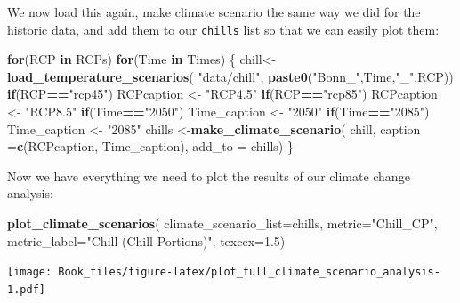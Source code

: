 \documentclass[
]{book}
\newenvironment{Shaded}{\begin{snugshade}}{\end{snugshade}}
\newcommand{\ControlFlowTok}[1]{\textcolor[rgb]{0.13,0.29,0.53}{\textbf{#1}}}
\newcommand{\DataTypeTok}[1]{\textcolor[rgb]{0.13,0.29,0.53}{#1}}
\newcommand{\FloatTok}[1]{\textcolor[rgb]{0.00,0.00,0.81}{#1}}
\newcommand{\KeywordTok}[1]{\textcolor[rgb]{0.13,0.29,0.53}{\textbf{#1}}}
\newcommand{\NormalTok}[1]{#1}
\newcommand{\OperatorTok}[1]{\textcolor[rgb]{0.81,0.36,0.00}{\textbf{#1}}}
\newcommand{\StringTok}[1]{\textcolor[rgb]{0.31,0.60,0.02}{#1}}
\begin{document}
We now load this again, make climate scenario the same way we did for the historic data, and add them to our \texttt{chills} list so that we can easily plot them:

\begin{Shaded}
\begin{Highlighting}[]
\ControlFlowTok{for}\NormalTok{(RCP }\ControlFlowTok{in}\NormalTok{ RCPs)}
  \ControlFlowTok{for}\NormalTok{(Time }\ControlFlowTok{in}\NormalTok{ Times)}
\NormalTok{    \{}
\NormalTok{    chill<-}\KeywordTok{load_temperature_scenarios}\NormalTok{(}
      \StringTok{"data/chill"}\NormalTok{,}
      \KeywordTok{paste0}\NormalTok{(}\StringTok{"Bonn_"}\NormalTok{,Time,}\StringTok{"_"}\NormalTok{,RCP))}
    \ControlFlowTok{if}\NormalTok{(RCP}\OperatorTok{==}\StringTok{"rcp45"}\NormalTok{) RCPcaption <-}\StringTok{ "RCP4.5"}
    \ControlFlowTok{if}\NormalTok{(RCP}\OperatorTok{==}\StringTok{"rcp85"}\NormalTok{) RCPcaption <-}\StringTok{ "RCP8.5"}
    \ControlFlowTok{if}\NormalTok{(Time}\OperatorTok{==}\StringTok{"2050"}\NormalTok{) Time_caption <-}\StringTok{ "2050"}
    \ControlFlowTok{if}\NormalTok{(Time}\OperatorTok{==}\StringTok{"2085"}\NormalTok{) Time_caption <-}\StringTok{ "2085"}
\NormalTok{    chills <-}\KeywordTok{make_climate_scenario}\NormalTok{(}
\NormalTok{      chill,}
      \DataTypeTok{caption =}\KeywordTok{c}\NormalTok{(RCPcaption, Time_caption),}
      \DataTypeTok{add_to =}\NormalTok{ chills)}
\NormalTok{\}}
\end{Highlighting}
\end{Shaded}

Now we have everything we need to plot the results of our climate change analysis:

\begin{Shaded}
\begin{Highlighting}[]
\KeywordTok{plot_climate_scenarios}\NormalTok{(}
  \DataTypeTok{climate_scenario_list=}\NormalTok{chills,}
  \DataTypeTok{metric=}\StringTok{"Chill_CP"}\NormalTok{,}
  \DataTypeTok{metric_label=}\StringTok{"Chill (Chill Portions)"}\NormalTok{,}
  \DataTypeTok{texcex=}\FloatTok{1.5}\NormalTok{)}
\end{Highlighting}
\end{Shaded}

\texttt{[image: Book\_files/figure-latex/plot\_full\_climate\_scenario\_analysis-1.pdf]}
\end{document}
